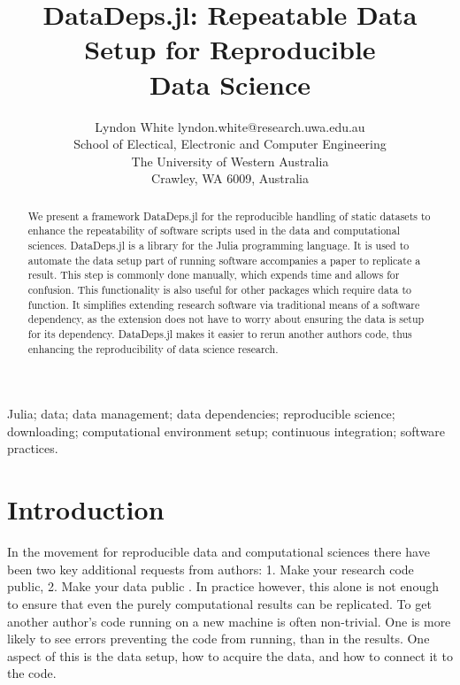 \documentclass[twoside,11pt]{article}
\begin{document}
\title{DataDeps.jl: Repeatable Data Setup for Reproducible\\ Data Science}
\author{\name Lyndon White \email lyndon.white@research.uwa.edu.au\\
	\addr School of Electical, Electronic and Computer Engineering\\
	The University of Western Australia\\
	Crawley, WA 6009, Australia
}
\editor{}


\maketitle

\begin{abstract}
	We present a framework DataDeps.jl for the reproducible handling of static datasets to enhance the repeatability of software scripts used in the data and computational sciences.
	DataDeps.jl is a library for the Julia programming language.
	It is used to automate the data setup part of running software accompanies a paper to replicate a result.
	This step is commonly done manually, which expends time and allows for confusion.
	This functionality is also useful for other packages which require data to function.
	It simplifies extending research software via traditional means of a software dependency, as the extension does not have to worry about ensuring the data is setup for its dependency.
	DataDeps.jl makes it easier to rerun another authors code, thus enhancing the reproducibility of data science research.
\end{abstract}

\begin{keywords}
Julia; data; data management;  data dependencies; reproducible science; downloading; computational environment setup; continuous integration; software practices.
\end{keywords}

\section{Introduction}

In the movement for reproducible data and computational sciences there have been two key additional requests from authors:
1. Make your research code public, 2. Make your data public \citep{lookafterdata}.
In practice however, this alone is not enough to ensure that even the purely computational results can be replicated.
To get another author's code running on a new machine is often non-trivial.
One is more likely to see errors preventing the code from running, than in the results.
One aspect of this is the data setup, how to acquire the data, and how to connect it to the code.
\end{document}

